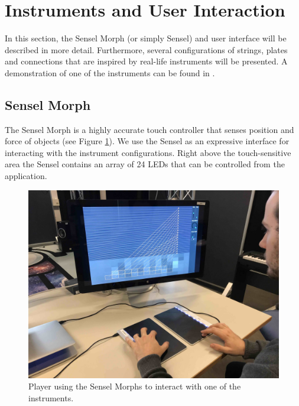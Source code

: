 \documentclass{article}
\begin{document}
\section{Instruments and User Interaction}\label{sec:instruments}
In this section, the Sensel Morph (or simply Sensel) and user interface will be described in more detail. Furthermore, several configurations of strings, plates and connections that are inspired by real-life instruments will be presented. A demonstration of one of the instruments can be found in \cite{video}.

\subsection{Sensel Morph}
The Sensel Morph is a highly accurate touch controller that senses position and force of objects \cite{sensel2018} (see Figure \ref{fig:sensel}). We use the Sensel as an expressive interface for interacting with the instrument configurations. Right above the touch-sensitive area the Sensel contains an array of 24 LEDs that can be controlled from the application.
\begin{figure}[h]\includegraphics[width=1.0\columnwidth]{senselLQ.jpg}\centering
\caption{Player using the Sensel Morphs to interact with one of the instruments.\label{fig:sensel}}
\end{figure}
\end{document}
